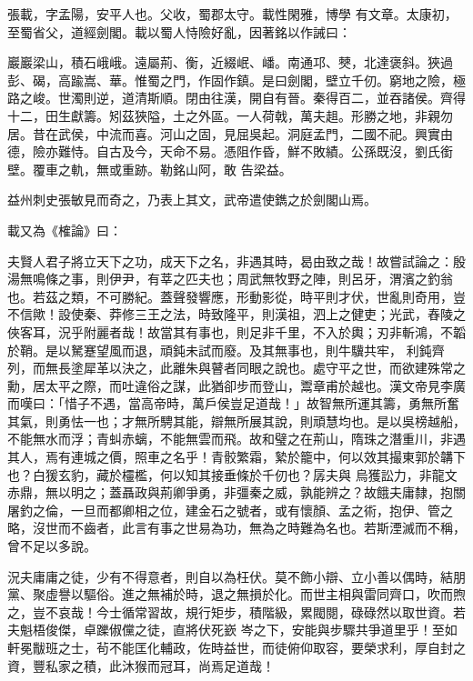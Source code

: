 \begin{pinyinscope}
 張載，字孟陽，安平人也。父收，蜀郡太守。載性閑雅，博學
 有文章。太康初，至蜀省父，道經劍閣。載以蜀人恃險好亂，因著銘以作誡曰：



 巖巖梁山，積石峨峨。遠屬荊、衡，近綴岷、嶓。南通邛、僰，北達褒斜。狹過彭、碣，高踰嵩、華。惟蜀之門，作固作鎮。是曰劍閣，壁立千仞。窮地之險，極路之峻。世濁則逆，道清斯順。閉由往漢，開自有晉。秦得百二，並吞諸侯。齊得十二，田生獻籌。矧茲狹隘，土之外區。一人荷戟，萬夫趄。形勝之地，非親勿居。昔在武侯，中流而喜。河山之固，見屈吳起。洞庭孟門，二國不祀。興實由德，險亦難恃。自古及今，天命不易。憑阻作昏，鮮不敗績。公孫既沒，劉氏銜壁。覆車之軌，無或重跡。勒銘山阿，敢
 告梁益。



 益州刺史張敏見而奇之，乃表上其文，武帝遣使鐫之於劍閣山焉。



 載又為《榷論》曰：



 夫賢人君子將立天下之功，成天下之名，非遇其時，曷由致之哉！故嘗試論之：殷湯無鳴條之事，則伊尹，有莘之匹夫也；周武無牧野之陣，則呂牙，渭濱之釣翁也。若茲之類，不可勝紀。蓋聲發響應，形動影從，時平則才伏，世亂則奇用，豈不信歟！設使秦、莽修三王之法，時致隆平，則漢祖，泗上之健吏；光武，舂陵之俠客耳，況乎附麗者哉！故當其有事也，則足非千里，不入於輿；刃非斬鴻，不韜於鞘。是以駑蹇望風而退，頑鈍未試而廢。及其無事也，則牛驥共牢，
 利鈍齊列，而無長塗犀革以決之，此離朱與瞽者同眼之說也。處守平之世，而欲建殊常之勳，居太平之際，而吐違俗之謀，此猶卻步而登山，鬻章甫於越也。漢文帝見李廣而嘆曰：「惜子不遇，當高帝時，萬戶侯豈足道哉！」故智無所運其籌，勇無所奮其氣，則勇怯一也；才無所騁其能，辯無所展其說，則頑慧均也。是以吳榜越船，不能無水而浮；青虯赤螭，不能無雲而飛。故和璧之在荊山，隋珠之潛重川，非遇其人，焉有連城之價，照車之名乎！青骹繁霜，縶於籠中，何以效其撮東郭於韝下也？白猨玄豹，藏於欞檻，何以知其接垂條於千仞也？孱夫與
 烏獲訟力，非龍文赤鼎，無以明之；蓋聶政與荊卿爭勇，非彊秦之威，孰能辨之？故餓夫庸隸，抱關屠釣之倫，一旦而都卿相之位，建金石之號者，或有懷顏、孟之術，抱伊、管之略，沒世而不齒者，此言有事之世易為功，無為之時難為名也。若斯湮滅而不稱，曾不足以多說。



 況夫庸庸之徒，少有不得意者，則自以為枉伏。莫不飾小辯、立小善以偶時，結朋黨、聚虛譽以驅俗。進之無補於時，退之無損於化。而世主相與雷同齊口，吹而煦之，豈不哀哉！今士循常習故，規行矩步，積階級，累閥閱，碌碌然以取世資。若夫魁梧俊傑，卓躒俶儻之徒，直將伏死嶔
 岑之下，安能與步驟共爭道里乎！至如軒冕黻班之士，茍不能匡化輔政，佐時益世，而徒俯仰取容，要榮求利，厚自封之資，豐私家之積，此沐猴而冠耳，尚焉足道哉！




\end{pinyinscope}
